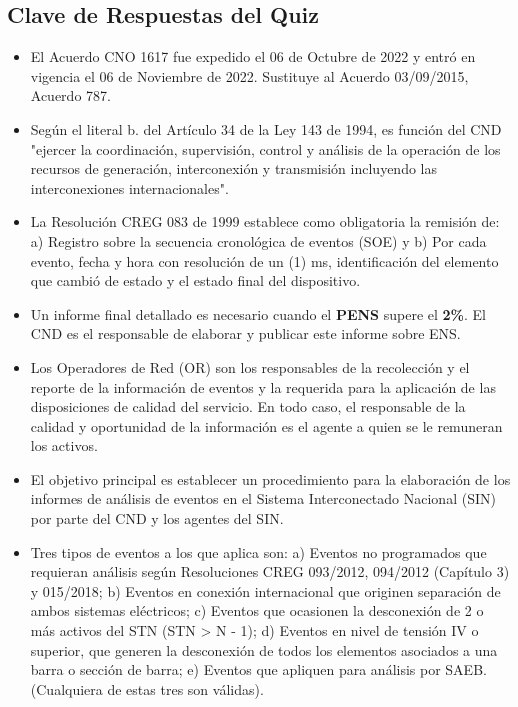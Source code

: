 \documentclass[a5paper]{book}%
\begin{document}
  \subsection{Clave de Respuestas del Quiz}

  \begin{itemize}

  \item El Acuerdo CNO 1617 fue expedido el 06 de Octubre de 2022 y entró en vigencia el 06 de Noviembre de 2022. Sustituye al Acuerdo 03/09/2015, Acuerdo 787.
  \item Según el literal b. del Artículo 34 de la Ley 143 de 1994, es función del CND "ejercer la coordinación, supervisión, control y análisis de la operación de los recursos de generación, interconexión y transmisión incluyendo las interconexiones internacionales".
  \item La Resolución CREG 083 de 1999 establece como obligatoria la remisión de: a) Registro sobre la secuencia cronológica de eventos (SOE) y b) Por cada evento, fecha y hora con resolución de un (1) ms, identificación del elemento que cambió de estado y el estado final del dispositivo.
  \item Un informe final detallado es necesario cuando el \textbf{PENS} supere el \textbf{2\%}. El CND es el responsable de elaborar y publicar este informe sobre \ac{ENS}.
  \item Los Operadores de Red (OR) son los responsables de la recolección y el reporte de la información de eventos y la requerida para la aplicación de las disposiciones de calidad del servicio. En todo caso, el responsable de la calidad y oportunidad de la información es el agente a quien se le remuneran los activos.
  \item El objetivo principal es establecer un procedimiento para la elaboración de los informes de análisis de eventos en el Sistema Interconectado Nacional (SIN) por parte del CND y los agentes del SIN.
  \item Tres tipos de eventos a los que aplica son: a) Eventos no programados que requieran análisis según Resoluciones CREG 093/2012, 094/2012 (Capítulo 3) y 015/2018; b) Eventos en conexión internacional que originen separación de ambos sistemas eléctricos; c) Eventos que ocasionen la desconexión de 2 o más activos del STN (STN > N - 1); d) Eventos en nivel de tensión IV o superior, que generen la desconexión de todos los elementos asociados a una barra o sección de barra; e) Eventos que apliquen para análisis por SAEB. (Cualquiera de estas tres son válidas).

\end{itemize}
\end{document}
